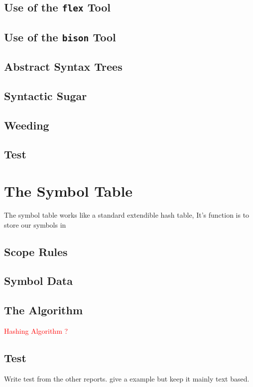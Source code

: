 \documentclass[a4paper,10pt,titlepage]{report}
\begin{document}
\subsection{Use of the {\tt flex} Tool}

\subsection{Use of the {\tt bison} Tool}

\subsection{Abstract Syntax Trees}

\subsection{Syntactic Sugar}

\subsection{Weeding}

\subsection{Test}

\section{The Symbol Table}
The symbol table works like a standard extendible hash table, It's function is to store our symbols in
\subsection{Scope Rules}

\subsection{Symbol Data}

\subsection{The Algorithm}
\textcolor{red}{Hashing Algorithm ?}

\subsection{Test}
Write test from the other reports. give a example but keep it mainly text based.
\end{document}
